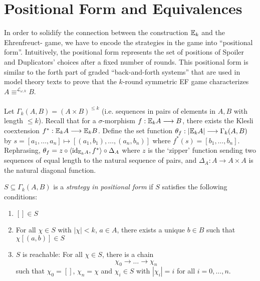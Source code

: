 \section{Positional Form and Equivalences}\label{sec:positionalFormEF}
In order to solidify the connection between the construction ${\mathbb{E}_{k}}$ and the Ehrenfreuct-{\Fraisse} game, we have to encode the strategies in the game into ``positional form''. Intuitively, the positional form represents the set of positions of Spoiler and Duplicators' choices after a fixed number of rounds. This positional form is similar to the forth part of graded ``back-and-forth systems'' that are used in model theory texts to prove that the $k$-round symmetric EF game characterizes $A \equiv^{\mathcal{L}_{\omega,k}} B$. \\~\\
Let $\Gamma_{k}(A,B) = (A \times B)^{\leq k}$ (i.e. sequences in pairs of elements in $A,B$ with length $\leq k$). Recall that for a $\sigma$-morphism $f:{\mathbb{E}_{k}A} \longrightarrow B$, there exists the Klesli coextension $f^{*}:{\mathbb{E}_{k}A} \longrightarrow {\mathbb{E}_{k}B}$. Define the set function $\theta_{f}:|{\mathbb{E}_{k}A}| \longrightarrow \Gamma_{k}(A,B)$ by $s = [a_{1},\dots,a_{n}] \mapsto [(a_{1},b_{1}),\dots,(a_{n},b_{n})]$ where $f^{*}(s) = [b_{1},\dots,b_{n}]$. Rephrasing, $\theta_{f} = z \circ \langle \text{id}_{{\mathbb{E}_{k}A}},f^{*} \rangle \circ \Delta_{A}$ where $z$ is the `zipper' function sending two sequences of equal length to the natural sequence of pairs, and $\Delta_{A}:A \longrightarrow A \times A$ is the natural diagonal function.  
\begin{defn}
$S \subseteq \Gamma_{k}(A,B)$ is a \textit{strategy in positional form} if $S$ satisfies the following conditions:
\begin{enumerate}[label=(S\arabic*),ref=S\arabic*,start=0]
\item $[] \in S$ \label{eq:S1st}
\item For all $\chi \in S$ with $|\chi| < k$, $a \in A$, there exists a unique $b \in B$ such that $\chi[(a,b)] \in S$ \label{eq:S2nd}
\item $S$ is reachable: For all $\chi \in S$, there is a chain \label{eq:S3rd}
$$\chi_{0} \longrightarrow \dots \longrightarrow \chi_{n}$$
such that $\chi_{0} = []$, $\chi_{n} = \chi$ and $\chi_{i} \in S$ with $|\chi_{i}| = i$ for all $i = 0,\dots,n$. 
\end{enumerate}
\end{defn}
